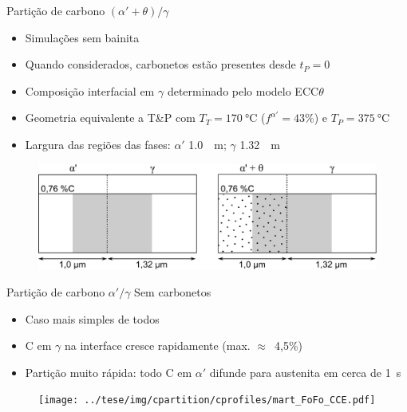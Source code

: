 \begin{frame}{Partição de carbono $(\alpha' + \theta)/\gamma$}
  \begin{itemize}
    \item Simulações sem bainita
    \item Quando considerados, carbonetos estão presentes desde $t_P = 0$
    \item Composição interfacial em $\gamma$ determinado pelo modelo ECC$\theta$
    \item Geometria equivalente a T\&P com $T_T = \SI{170}{\degreeCelsius}$ ($f^{\alpha'} = 43\%$) e $T_P = \SI{375}{\degreeCelsius}$
    \item Largura das regiões das fases: $\alpha'$ \SI{1.0}{\mu m}; $\gamma$ \SI{1.32}{\mu m}
  \end{itemize}

  \begin{figure}
    \includegraphics[width=.8\textwidth]{img/simulations_nobainite.pdf}
  \end{figure}
\end{frame}

\begin{frame}{Partição de carbono $\alpha'/\gamma$}
  Sem carbonetos

  \begin{itemize}
    \item Caso mais simples de todos
    \item C em $\gamma$ na interface cresce rapidamente (max. $\approx$~4,5\%)
    \item Partição muito rápida: todo C em $\alpha'$ difunde para austenita em cerca de 1~s
  \end{itemize}

  \begin{figure}
    \texttt{[image: ../tese/img/cpartition/cprofiles/mart\_FoFo\_CCE.pdf]}
  \end{figure}
\end{frame}

